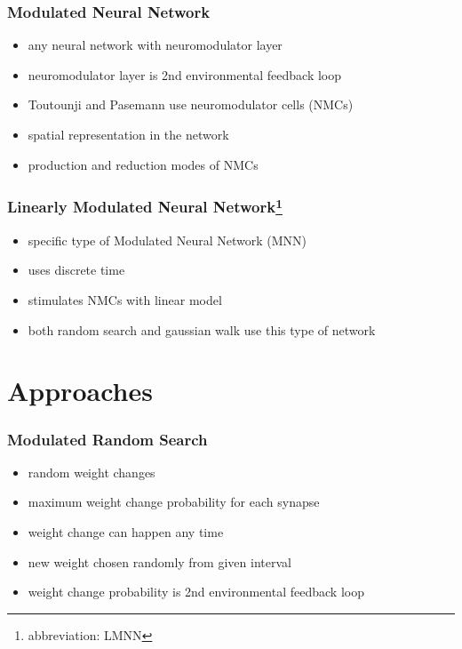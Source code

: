 \documentclass[14pt]{beamer}
\theoremstyle{remark}
\begin{document}
\begin{frame}[t]
    \frametitle{Modulated Neural Network}
    \begin{itemize}
  	    \item any neural network with neuromodulator layer
        \vfill
        \item neuromodulator layer is 2nd environmental feedback loop
        \vfill
        \item Toutounji and Pasemann use neuromodulator cells (NMCs)
        \vfill
        \item spatial representation in the network
        \vfill
        \item production and reduction modes of NMCs
	\end{itemize}
\end{frame}

\begin{frame}[t]
    \frametitle{Linearly Modulated Neural Network\footnote{abbreviation: LMNN}}
    \begin{itemize}
  	    \item specific type of Modulated Neural Network (MNN)
        \vfill
        \item uses discrete time
        \vfill
        \item stimulates NMCs with linear model
        \vfill
        \item both random search and gaussian walk use this type of network
	\end{itemize}
\end{frame}

\section{Approaches}

\begin{frame}[t]
    \frametitle{Modulated Random Search}
    \begin{itemize}
  	    \item random weight changes
        \vfill
        \item maximum weight change probability for each synapse
        \vfill
        \item weight change can happen any time
        \vfill
        \item new weight chosen randomly from given interval
        \vfill
        \item weight change probability is 2nd environmental feedback loop
	\end{itemize}
\end{frame}
\end{document}

